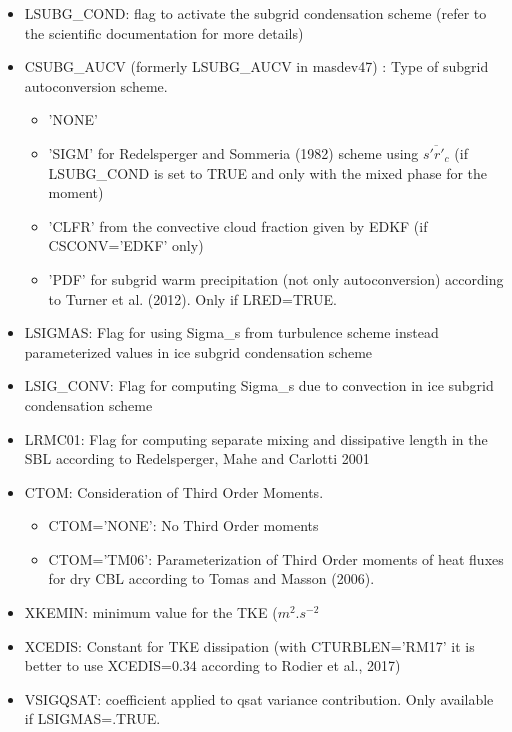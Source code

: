 \begin{itemize}
\item
{}
LSUBG\_COND: flag to activate the subgrid condensation scheme (refer to the scientific 
documentation for more details)

\item
{}
CSUBG\_AUCV (formerly LSUBG\_AUCV in masdev47) : Type of subgrid autoconversion scheme.
\begin{itemize}
\item  'NONE' 
\item 'SIGM' for Redelsperger and Sommeria (1982) scheme using $\overline{s'r'_{c}}$ 
(if LSUBG\_COND
is set to TRUE and only with the mixed phase for the moment)
\item 'CLFR' from the convective cloud fraction given by EDKF 
(if CSCONV='EDKF' only)
\item 'PDF' for subgrid warm precipitation (not only autoconversion) according to Turner et al. (2012). Only if LRED=TRUE.
\end{itemize}

\item
{}
LSIGMAS: Flag for using Sigma\_s from turbulence scheme instead parameterized values
in ice subgrid condensation scheme

\item
{}
LSIG\_CONV: Flag for computing Sigma\_s due to convection in ice subgrid 
condensation scheme

\item
{}
LRMC01: Flag for computing separate mixing and dissipative length
in the SBL according to Redelsperger, Mahe and Carlotti 2001

\item
{}
CTOM: Consideration of Third Order Moments.

\begin{itemize}
\item
CTOM='NONE': No Third Order moments                             
\item
CTOM='TM06': Parameterization of Third Order moments of heat fluxes for dry CBL
according to Tomas and Masson (2006).
\end{itemize}

\item
{}
XKEMIN: minimum value for the TKE ($m^{2}.s^{-2}$

\item
{}
XCEDIS: Constant for TKE dissipation
(with CTURBLEN='RM17' it is better to use XCEDIS=0.34 according to Rodier et al., 2017)

\item
{}
VSIGQSAT: coefficient applied to qsat variance contribution. Only available if LSIGMAS=.TRUE.

\end{itemize}

